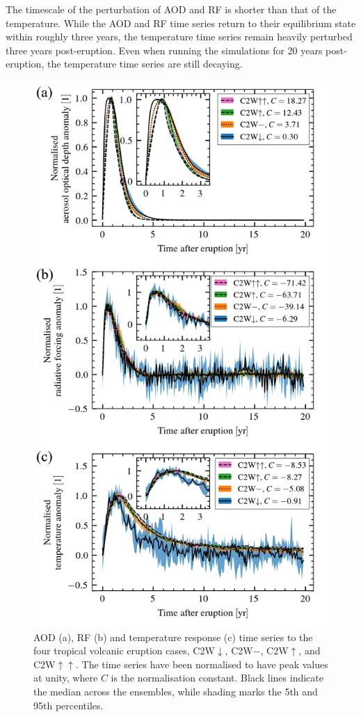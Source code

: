 \documentclass[draft]{agujournal2019}
\begin{document}
The timescale of the perturbation of AOD and RF is shorter than that of the temperature.
While the AOD and RF time series return to their equilibrium state within roughly three
years, the temperature time series remain heavily perturbed three years post-eruption.
Even when running the simulations for 20 years post-eruption, the temperature time
series are still decaying.

\begin{figure}
  \centering
  \includegraphics{figures/figure1.png}

  \caption{AOD (a), RF (b) and temperature response (c) time series to the four tropical
    volcanic eruption cases, C2W\(\downarrow\), C2W\(-\), C2W\(\uparrow\), and
    C2W\(\uparrow\uparrow\). The time series have been normalised to have peak values at
    unity, where \(C\) is the normalisation constant. Black lines indicate the median across
    the ensembles, while shading marks the 5th and 95th
    percentiles.}\label{fig:1_compare_waveform}%
\end{figure}
\end{document}
